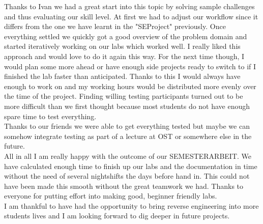Thanks to Ivan we had a great start into this topic by solving sample challenges and thus evaluating our skill level.
At first we had to adjust our workflow since it differs from the one we have learnt in the "SEProject" previously.
Once everything settled we quickly got a good overview of the problem domain and started iteratively working on our labs which worked well. 
I really liked this approach and would love to do it again this way. 
For the next time though, I would plan some more ahead or have enough side projects ready to switch to if I finished the lab faster than anticipated.
Thanks to this I would always have enough to work on and my working hours would be distributed more evenly over the time of the project.
Finding willing testing participants turned out to be more difficult than we first thought because most students do not have enough spare time to test everything. \\
Thanks to our friends we were able to get everything tested but maybe we can somehow integrate testing as part of a lecture at OST or somewhere else in the future.  \\
All in all I am really happy with the outcome of our SEMESTERARBEIT. 
We have calculated enough time to finish up our labs and the documentation in time without the need of several nightshifts the days before hand in.
This could not have been made this smooth without the great teamwork we had. Thanks to everyone for putting effort into making good, beginner friendly labs. \\
I am thankful to have had the opportunity to bring reverse engineering into more students lives and I am looking forward to dig deeper in future projects.
